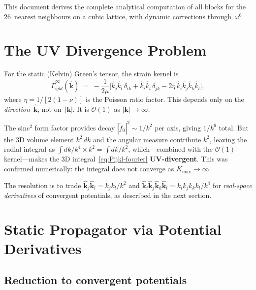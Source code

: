 \documentclass[11pt,a4paper]{article}
\newcommand{\bk}{\bm{k}}
\newcommand{\kh}{\hat{\bm{k}}}
\newcommand{\order}{\mathcal{O}}
\theoremstyle{plain}
\theoremstyle{remark}
\begin{document}
This document derives the complete analytical computation of all
blocks for the 26~nearest neighbours on a cubic lattice, with dynamic
corrections through~$\omega^6$.


\section{The UV Divergence Problem}
\label{sec:uv}

For the static (Kelvin) Green's tensor, the strain kernel is
\begin{equation}
  \tilde{\Gamma}^\infty_{ijkl}(\kh) \;=\;
  -\frac{1}{2\mu}\bigl[
    \hat{k}_j\hat{k}_l\,\delta_{ik}
  + \hat{k}_i\hat{k}_l\,\delta_{jk}
  - 2\eta\,\hat{k}_i\hat{k}_j\hat{k}_k\hat{k}_l
  \bigr],
  \label{eq:Gamma-inf}
\end{equation}
where $\eta = 1/[2(1-\nu)]$ is the Poisson ratio factor.
This depends only on the \emph{direction}~$\kh$, not on~$|\bk|$.
It is $\order(1)$ as $|\bk|\to\infty$.

The sinc$^2$ form factor provides decay $|\tilde{f}_0|^2 \sim 1/k^2$
per axis, giving $1/k^6$ total.  But the 3D volume element $k^2\,dk$
and the angular measure contribute $k^2$, leaving the radial integral
as $\int dk/k^4 \times k^2 = \int dk/k^2$, which---combined with the
$\order(1)$ kernel---makes the 3D integral~\eqref{eq:Pijkl-fourier}
\textbf{UV-divergent}.  This was confirmed numerically: the integral
does not converge as $K_{\max}\to\infty$.

The resolution is to trade $\kh_j\kh_l = k_j k_l/k^2$ and
$\kh_i\kh_j\kh_k\kh_l = k_ik_jk_kk_l/k^4$ for \emph{real-space
derivatives} of convergent potentials, as described in the next
section.


\section{Static Propagator via Potential Derivatives}
\label{sec:static}

\subsection{Reduction to convergent potentials}
\end{document}
